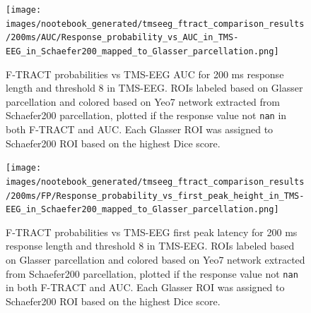 \begin{figure}
  \begin{center}
    \texttt{[image: images/nootebook\_generated/tmseeg\_ftract\_comparison\_results/200ms/AUC/Response\_probability\_vs\_AUC\_in\_TMS-EEG\_in\_Schaefer200\_mapped\_to\_Glasser\_parcellation.png]}
  \end{center}
  \caption[F-TRACT probabilities vs TMS-EEG AUC]{F-TRACT probabilities vs TMS-EEG AUC for 200 ms response length and threshold 8 in TMS-EEG. ROIs labeled based on Glasser parcellation and colored based on Yeo7 network extracted from Schaefer200 parcellation, plotted if the response value not \texttt{nan} in both F-TRACT and AUC. Each Glasser ROI was assigned to Schaefer200 ROI based on the highest Dice score.}
  \label{fig:response_tmsAUC-ftract_scatter}
\end{figure}

\begin{figure}
  \begin{center}
    \texttt{[image: images/nootebook\_generated/tmseeg\_ftract\_comparison\_results/200ms/FP/Response\_probability\_vs\_first\_peak\_height\_in\_TMS-EEG\_in\_Schaefer200\_mapped\_to\_Glasser\_parcellation.png]}
  \end{center}
  \caption[F-TRACT probabilities vs TMS-EEG first peak latency]{F-TRACT probabilities vs TMS-EEG first peak latency for 200 ms response length and threshold 8 in TMS-EEG. ROIs labeled based on Glasser parcellation and colored based on Yeo7 network extracted from Schaefer200 parcellation, plotted if the response value not \texttt{nan} in both F-TRACT and AUC. Each Glasser ROI was assigned to Schaefer200 ROI based on the highest Dice score.}
  \label{response_tmsFP-ftract_scatter}
\end{figure}